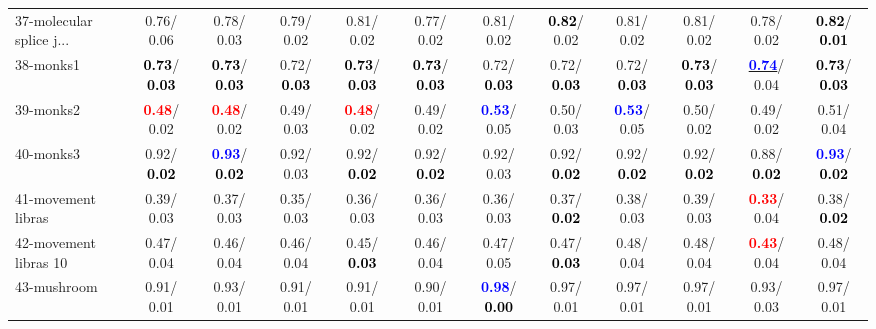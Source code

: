 \begin{table}[h]
\begin{center}
{\begin{tabular}{lc|c|c|c|c|c|c|c|c|c|c}
37-molecular splice j... &   0.76/  0.06 &   0.78/  0.03 &   0.79/  0.02 &   0.81/  0.02 &   0.77/  0.02 &   0.81/  0.02 & \textcolor{black}{\textbf{  0.82}}/  0.02 &   0.81/  0.02 &   0.81/  0.02 &   0.78/  0.02 & \textcolor{black}{\textbf{  0.82}}/\textcolor{black}{\textbf{  0.01}} \\
38-monks1 & \textcolor{black}{\textbf{  0.73}}/\textcolor{black}{\textbf{  0.03}} & \textcolor{black}{\textbf{  0.73}}/\textcolor{black}{\textbf{  0.03}} &   0.72/\textcolor{black}{\textbf{  0.03}} & \textcolor{black}{\textbf{  0.73}}/\textcolor{black}{\textbf{  0.03}} & \textcolor{black}{\textbf{  0.73}}/\textcolor{black}{\textbf{  0.03}} &   0.72/\textcolor{black}{\textbf{  0.03}} &   0.72/\textcolor{black}{\textbf{  0.03}} &   0.72/\textcolor{black}{\textbf{  0.03}} & \textcolor{black}{\textbf{  0.73}}/\textcolor{black}{\textbf{  0.03}} & \underline{\textcolor{blue}{\textbf{  0.74}}}/  0.04 & \textcolor{black}{\textbf{  0.73}}/\textcolor{black}{\textbf{  0.03}} \\
39-monks2 & \textcolor{red}{\textbf{  0.48}}/  0.02 & \textcolor{red}{\textbf{  0.48}}/  0.02 &   0.49/  0.03 & \textcolor{red}{\textbf{  0.48}}/  0.02 &   0.49/  0.02 & \textcolor{blue}{\textbf{  0.53}}/  0.05 &   0.50/  0.03 & \textcolor{blue}{\textbf{  0.53}}/  0.05 &   0.50/  0.02 &   0.49/  0.02 &   0.51/  0.04 \\ \hline
40-monks3 &   0.92/\textcolor{black}{\textbf{  0.02}} & \textcolor{blue}{\textbf{  0.93}}/\textcolor{black}{\textbf{  0.02}} &   0.92/  0.03 &   0.92/\textcolor{black}{\textbf{  0.02}} &   0.92/\textcolor{black}{\textbf{  0.02}} &   0.92/  0.03 &   0.92/\textcolor{black}{\textbf{  0.02}} &   0.92/\textcolor{black}{\textbf{  0.02}} &   0.92/\textcolor{black}{\textbf{  0.02}} &   0.88/\textcolor{black}{\textbf{  0.02}} & \textcolor{blue}{\textbf{  0.93}}/\textcolor{black}{\textbf{  0.02}} \\
41-movement libras &   0.39/  0.03 &   0.37/  0.03 &   0.35/  0.03 &   0.36/  0.03 &   0.36/  0.03 &   0.36/  0.03 &   0.37/\textcolor{black}{\textbf{  0.02}} &   0.38/  0.03 &   0.39/  0.03 & \textcolor{red}{\textbf{  0.33}}/  0.04 &   0.38/\textcolor{black}{\textbf{  0.02}} \\
42-movement libras 10 &   0.47/  0.04 &   0.46/  0.04 &   0.46/  0.04 &   0.45/\textcolor{black}{\textbf{  0.03}} &   0.46/  0.04 &   0.47/  0.05 &   0.47/\textcolor{black}{\textbf{  0.03}} &   0.48/  0.04 &   0.48/  0.04 & \textcolor{red}{\textbf{  0.43}}/  0.04 &   0.48/  0.04 \\
43-mushroom &   0.91/  0.01 &   0.93/  0.01 &   0.91/  0.01 &   0.91/  0.01 &   0.90/  0.01 & \textcolor{blue}{\textbf{  0.98}}/\textcolor{black}{\textbf{  0.00}} &   0.97/  0.01 &   0.97/  0.01 &   0.97/  0.01 &   0.93/  0.03 &   0.97/  0.01 \\

\end{tabular}}
\end{center}
\end{table}
